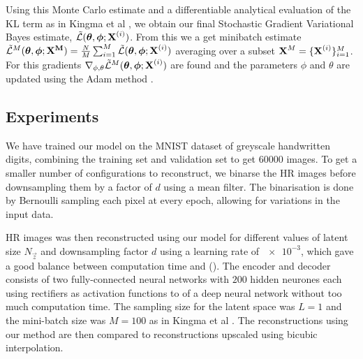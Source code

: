 Using this Monte Carlo estimate and a differentiable analytical evaluation of the KL term as in Kingma et al \cite{Kingma2013}, we obtain our final Stochastic Gradient Variational Bayes estimate, $\tilde{\mathcal{L}}(\bm{\mathrm{\theta}},\bm{\mathrm{\phi}};\bm{\mathrm{X}}^{(i)})$. From this we a get minibatch estimate $\tilde{\mathcal{L}}^M(\bm{\mathrm{\theta}},\bm{\mathrm{\phi}};\bm{\mathrm{X^M}}) = \frac{N}{M}\sum^{M}_{i=1}\tilde{\mathcal{L}}(\bm{\mathrm{\theta}},\bm{\mathrm{\phi}};\bm{\mathrm{X}}^{(i)})$ averaging over a subset $\bm{\mathrm{X}}^M = \{\bm{\mathrm{X}}^{(i)}\}^M_{i=1}$. 
For this gradients $\nabla_{\phi,\theta} \tilde{\mathcal{L}}^M(\bm{\mathrm{\theta}},\bm{\mathrm{\phi}};\bm{\mathrm{X}}^{(i)})$ are found and the parameters $\phi$ and $\theta$ are updated using the Adam method \cite{Kingma2014b}. 



\subsection{Experiments}
\label{sub:experiments}

We have trained our model on the MNIST dataset \cite{MNIST} of greyscale handwritten digits, combining the training set and validation set to get $60000$ images.  
To get a smaller number of configurations to reconstruct, we binarse the HR images before downsampling them by a factor of $d$ using a mean filter.
The binarisation is done by Bernoulli sampling each pixel at every epoch, allowing for variations in the input data.

HR images was then reconstructed using our model for different values of latent size $N_{\vec{z}}$ and downsampling factor $d$ using a learning rate of $\num{e-3}$, which gave a good balance between computation time and  ().
The encoder and decoder consists of two fully-connected neural networks with $200$ hidden neurones each using rectifiers as activation functions to  of a deep neural network without too much computation time.
The sampling size for the latent space was $L = 1$ and the mini-batch size was $M = 100$ as in Kingma et al \cite{Kingma2013}.
The reconstructions using our method are then compared to reconstructions upscaled using bicubic interpolation.
